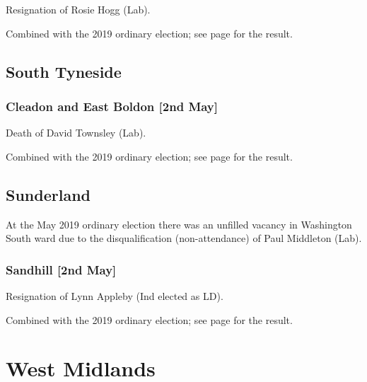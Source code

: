 \documentclass[a4paper,openany]{book}
\begin{document}
\begin{resultsiii}

Resignation of Rosie Hogg (Lab).

Combined with the 2019 ordinary election; see page \pageref{NewcastleTyneMonument} for the result.

\subsection*{South Tyneside}

\subsubsection*{Cleadon and East Boldon \hspace*{\fill}\nolinebreak[1]%
	\enspace\hspace*{\fill}
	[2nd May]}


Death of David Townsley (Lab).

Combined with the 2019 ordinary election; see page \pageref{SouthTynesideCleadonEastBoldon} for the result.

\subsection*{Sunderland}

At the May 2019 ordinary election there was an unfilled vacancy in Washington South ward due to the disqualification (non-attendance) of Paul Middleton (Lab).

\subsubsection*{Sandhill \hspace*{\fill}\nolinebreak[1]%
	\enspace\hspace*{\fill}
	[2nd May]}


Resignation of Lynn Appleby (Ind elected as LD).

Combined with the 2019 ordinary election; see page \pageref{SandhillSunderland} for the result.

\section{West Midlands}


\end{resultsiii}
\end{document}
